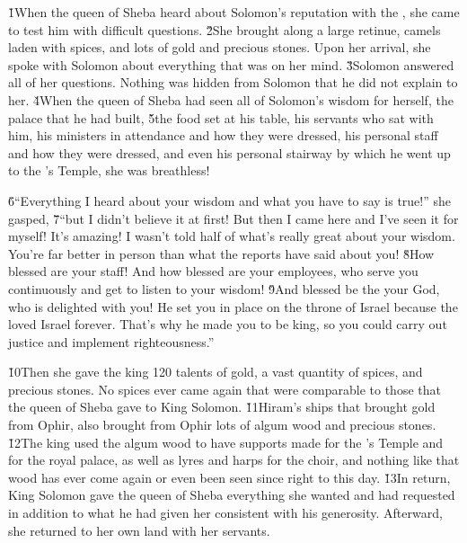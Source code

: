 \v{1}When the queen of Sheba heard about Solomon's reputation with the , she came to test him with difficult questions. \v{2}She brought along a large retinue, camels laden with spices, and lots of gold and precious stones. Upon her arrival, she spoke with Solomon about everything that was on her mind. \v{3}Solomon answered all of her questions. Nothing was hidden from Solomon that he did not explain to her. \v{4}When the queen of Sheba had seen all of Solomon's wisdom for herself, the palace that he had built, \v{5}the food set at his table, his servants who sat with him, his ministers in attendance and how they were dressed, his personal staff and how they were dressed, and even his personal stairway by which he went up to the 's Temple, she was breathless!

\v{6}``Everything I heard about your wisdom and what you have to say is true!'' she gasped, \v{7}``but I didn't believe it at first! But then I came here and I've seen it for myself! It's amazing! I wasn't told half of what's really great about your wisdom. You're far better in person than what the reports have said about you! \v{8}How blessed are your staff! And how blessed are your employees, who serve you continuously and get to listen to your wisdom! \v{9}And blessed be the  your God, who is delighted with you! He set you in place on the throne of Israel because the  loved Israel forever. That's why he made you to be king, so you could carry out justice and implement righteousness.''

\v{10}Then she gave the king 120 talents of gold, a vast quantity of spices, and precious stones. No spices ever came again that were comparable to those that the queen of Sheba gave to King Solomon. \v{11}Hiram's ships that brought gold from Ophir, also brought from Ophir lots of algum wood and precious stones. \v{12}The king used the algum wood to have supports made for the 's Temple and for the royal palace, as well as lyres and harps for the choir, and nothing like that wood has ever come again or even been seen since right to this day. \v{13}In return, King Solomon gave the queen of Sheba everything she wanted and had requested in addition to what he had given her consistent with his generosity. Afterward, she returned to her own land with her servants.

